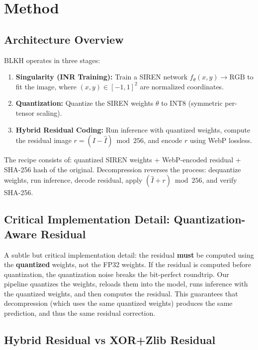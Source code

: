 \documentclass[11pt,a4paper]{article}
\begin{document}
\section{Method}

\subsection{Architecture Overview}

BLKH operates in three stages:

\begin{enumerate}
    \item \textbf{Singularity (INR Training):} Train a SIREN network $f_\theta(x, y) \to \text{RGB}$ to fit the image, where $(x, y) \in [-1, 1]^2$ are normalized coordinates.
    \item \textbf{Quantization:} Quantize the SIREN weights $\theta$ to INT8 (symmetric per-tensor scaling).
    \item \textbf{Hybrid Residual Coding:} Run inference with quantized weights, compute the residual image $r = (I - \hat{I}) \bmod 256$, and encode $r$ using WebP lossless.
\end{enumerate}

The recipe consists of: quantized SIREN weights + WebP-encoded residual + SHA-256 hash of the original. Decompression reverses the process: dequantize weights, run inference, decode residual, apply $( \hat{I} + r ) \bmod 256$, and verify SHA-256.

\subsection{Critical Implementation Detail: Quantization-Aware Residual}

A subtle but critical implementation detail: the residual \textbf{must} be computed using the \textbf{quantized} weights, not the FP32 weights. If the residual is computed before quantization, the quantization noise breaks the bit-perfect roundtrip. Our pipeline quantizes the weights, reloads them into the model, runs inference with the quantized weights, and then computes the residual. This guarantees that decompression (which uses the same quantized weights) produces the same prediction, and thus the same residual correction.

\subsection{Hybrid Residual vs XOR+Zlib Residual}
\end{document}
